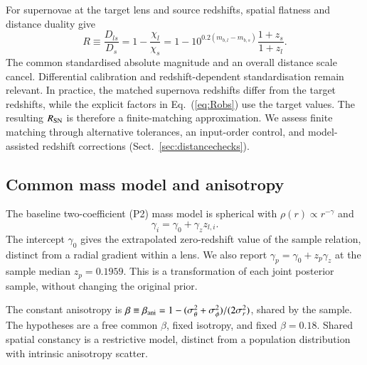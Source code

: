 \documentclass{aa}
\begin{document}
For supernovae at the target lens and source redshifts, spatial flatness and distance duality give
\begin{equation}\label{eq:Robs}
R\equiv\frac{D_{ls}}{D_s}=1-\frac{\chi_l}{\chi_s}
=1-10^{0.2(m_{b,l}-m_{b,s})}\frac{1+z_s}{1+z_l}.
\end{equation}
The common standardised absolute magnitude and an overall distance scale cancel. Differential calibration and redshift-dependent standardisation remain relevant. In practice, the matched supernova redshifts differ from the target redshifts, while the explicit factors in Eq.~(\ref{eq:Robs}) use the target values. The resulting $R_{\rm SN}$ is therefore a finite-matching approximation. We assess finite matching through alternative tolerances, an input-order control, and model-assisted redshift corrections (Sect.~\ref{sec:distancechecks}).

\subsection{Common mass model and anisotropy}\label{sec:P2}
The baseline two-coefficient (P2) mass model is spherical with $\rho(r)\propto r^{-\gamma}$ and
\begin{equation}\label{eq:P2}
\gamma_i=\gamma_0+\gamma_z z_{l,i}.
\end{equation}
The intercept $\gamma_0$ gives the extrapolated zero-redshift value of the sample relation, distinct from a radial gradient within a lens. We also report $\gamma_p=\gamma_0+z_p\gamma_z$ at the sample median $z_p=0.1959$. This is a transformation of each joint posterior sample, without changing the original prior.

The constant anisotropy is $\beta\equiv\beta_{\rm ani}=1-(\sigma_\theta^2+\sigma_\phi^2)/(2\sigma_r^2)$, shared by the sample. The hypotheses are a free common $\beta$, fixed isotropy, and fixed $\beta=0.18$. Shared spatial constancy is a restrictive model, distinct from a population distribution with intrinsic anisotropy scatter.
\end{document}
